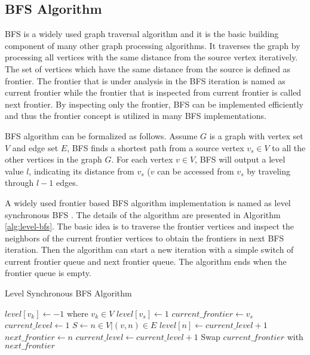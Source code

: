 \subsection{BFS Algorithm}
BFS is a widely used graph traversal algorithm and it is the basic 
building component of many other graph processing algorithms. 
It traverses the graph by processing all vertices with the same distance from the 
source vertex iteratively. The set of vertices which have the same distance from the 
source is defined as frontier. The frontier that is under analysis in the BFS iteration 
is named as current frontier while the frontier that is inspected from current frontier 
is called next frontier. By inspecting only the frontier, BFS can be implemented efficiently 
and thus the frontier concept is utilized in many BFS implementations.

BFS algorithm can be formalized as follows. Assume $G$ is a graph with vertex 
set $V$ and edge set $E$, BFS finds a shortest path from a source vertex
$v_s \in V$ to all the other vertices in the graph $G$. For each vertex $v \in V$, 
BFS will output a level value $l$, indicating its distance from $v_s$ ($v$ can be accessed 
from $v_s$ by traveling through $l - 1$ edges. 

A widely used frontier based BFS algorithm implementation is named as 
level synchronous BFS \cite{attia2014cygraph, betkaoui2012reconfigurable, 
zhang2017boosting}. The details of the algorithm are presented in 
Algorithm \ref{alg:level-bfs}.
The basic idea is to traverse the frontier vertices and inspect the neighbors 
of the current frontier vertices to obtain the frontiers in next BFS iteration. 
Then the algorithm can start a new iteration with a simple switch of 
current frontier queue and next frontier queue. The algorithm ends when 
the frontier queue is empty.

\begin{algorithm}
    \small
	\caption{Level Synchronous BFS Algorithm} \label{alg:level-bfs}
	\begin{algorithmic}[1]
		\State $level[v_k] \gets -1$ where $v_k \in V$
		\State $level[v_s] \gets 1$
		\State $current\_frontier \gets v_s$
		\State $current\_level \gets 1$
		\State $S \gets {n \in V | (v, n) \in E}$
		\State $level[n] \gets current\_level + 1$
		\State $next\_frontier \gets n$
		\EndIf
		\EndFor
		\EndFor
		\State $current\_level \gets current\_level + 1$
		\State Swap $current\_frontier$ with $next\_frontier$
		\EndWhile
		\EndProcedure
	\end{algorithmic}
\end{algorithm}

